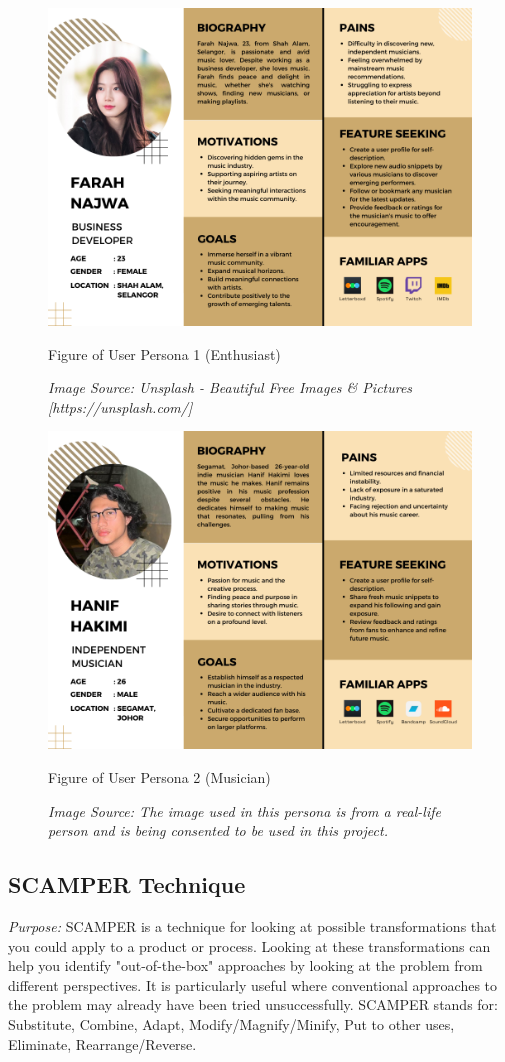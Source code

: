 \begin{figure}[h]
    \centering
    \includegraphics[width=0.9\linewidth]{mainmatter/images/userpersona1.png}
	\caption{Figure of User Persona 1 (Enthusiast)}
    \caption*{\textit{Image Source: Unsplash - Beautiful Free Images \& Pictures [https://unsplash.com/]}}
    \label{fig:myfig40}
\end{figure}

\begin{figure}[h]
    \centering
    \includegraphics[width=0.9\linewidth]{mainmatter/images/userpersona2.png}
	\caption{Figure of User Persona 2 (Musician)}
    \caption*{\textit{Image Source: The image used in this persona is from a real-life person and is being consented to be used in this project.}}
    \label{fig:myfig41}
\end{figure}
\pagebreak

\subsection{SCAMPER Technique}
\textit{Purpose:} SCAMPER is a technique for looking at possible transformations that you could apply to a product or process. \parencite{santos15} Looking at these transformations can help you identify "out-of-the-box" approaches by looking at the problem from different perspectives. It is particularly useful where conventional approaches to the problem may already have been tried unsuccessfully. SCAMPER stands for: Substitute, Combine, Adapt, Modify/Magnify/Minify, Put to other uses, Eliminate, Rearrange/Reverse.
\pagebreak

